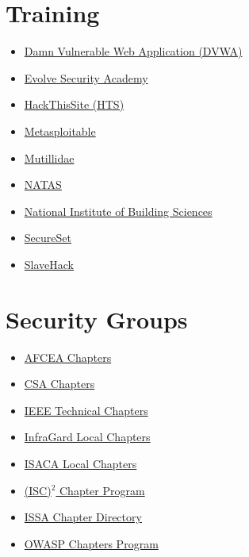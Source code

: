 \documentclass[a4paper, 12pt, titlepage]{report}
\begin{document}
\section{Training}
\begin{multicols}{2}
\begin{itemize}
\item \href{http://www.dvwa.co.uk/}{Damn Vulnerable Web Application (DVWA)}
\item \href{https://www.evolvesecurity.io/academy/home}{Evolve Security Academy}
\item \href{https://www.hackthissite.org/}{HackThisSite (HTS)}
\item \href{https://metasploit.help.rapid7.com/docs/metasploitable-2-exploitability-guide}{Metasploitable}
\item \href{https://www.irongeek.com/i.php?page=mutillidae/mutillidae-deliberately-vulnerable-php-owasp-top-10}{Mutillidae}
\item \href{http://overthewire.org/wargames/natas/}{NATAS}
\item \href{https://www.nibs.org/default.aspx}{National Institute of Building Sciences}
\item \href{https://secureset.com/}{SecureSet}
\item \href{https://www.slavehack2.com/}{SlaveHack}
\end{itemize}
\end{multicols}
\section{Security Groups}
\begin{multicols}{2}
\begin{itemize}
\item \href{https://www.afcea.org/membership/chapters/search.jsp}{AFCEA Chapters}
\item \href{https://cloudsecurityalliance.org/chapters/global/}{CSA Chapters}
\item \href{https://mga.ieee.org/resources-operations/geographic-unit/chapters}{IEEE Technical Chapters}
\item \href{https://www.infragard.org/Application/General/ChapterList}{InfraGard Local Chapters}
\item \href{https://www.isaca.org/Membership/Local-Chapter-Information/Pages/default.aspx}{ISACA Local Chapters}
\item \href{https://www.isc2.org/Chapters}{(ISC)$^{2}$ Chapter Program}
\item \href{https://www.issa.org/general/custom.asp?page=chapter_main}{ISSA Chapter Directory}
\item \href{https://www.owasp.org/index.php/OWASP_Chapter}{OWASP Chapters Program}
\end{itemize}
\end{multicols}
\end{document}
